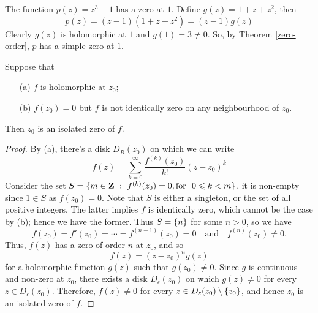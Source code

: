 \vspace*{1em}

\begin{example}
The function $p(z) = z^3 - 1$ has a zero at $1$. Define $g(z) = 1 + z + z^2$, then
\[p(z) = (z - 1)(1 + z + z^2) = (z - 1)g(z)\]
Clearly $g(z)$ is holomorphic at $1$ and $g(1) = 3 \neq 0$. So, by Theorem \ref{zero-order}, $p$ has a simple zero at $1$.
\end{example}

\vspace*{1em}

\begin{theorem}
Suppose that
\begin{itemize}
\item[(a)] $f$ is holomorphic at $z_0$;
\item[(b)] $f(z_0) = 0$ but $f$ is not identically zero on any neighbourhood of $z_0$.
\end{itemize}
Then $z_0$ is an isolated zero of $f$.
\end{theorem}
\begin{proof}
By (a), there's a disk $D_R(z_0)$ on which we can write
\[f(z) = \sum_{k=0}^\infty\frac{f^{(k)}(z_0)}{k!}(z - z_0)^k\]
Consider the set $S = \{m \in \zz\ :\ f^{(k)}(z_0) = 0,\text{for }\ 0 \leq k < m\}$, it is non-empty since $1 \in S$ as $f(z_0) = 0$. Note that $S$ is either a singleton, or the set of all positive integers. The latter implies $f$ is identically zero, which cannot be the case by (b); hence we have the former. Thus $S = \left\{n\right\}$ for some $n > 0$, so we have \[f(z_0) = f'(z_0) = \cdots = f^{(n-1)}(z_0) = 0 \quad \text{and} \quad f^{(n)}(z_0) \neq 0.\] Thus, $f(z)$ has a zero of order $n$ at $z_0$, and so
\[f(z) = (z - z_0)^ng(z)\]
for a holomorphic function $g(z)$ such that $g(z_0) \neq 0$. Since $g$ is continuous and non-zero at $z_0$, there exists a disk $D_\epsilon(z_0)$ on which $g(z) \neq 0$ for every $z \in D_\epsilon(z_0)$. Therefore, $f(z) \neq 0$ for every $z \in D_\varepsilon(z_0)\setminus\left\{z_0\right\}$, and hence $z_0$ is an isolated zero of $f$.
\end{proof}

\vspace*{2em}


